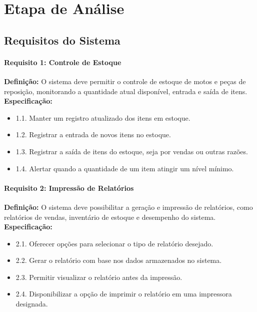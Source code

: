 
\chapter{Etapa de An\'{a}lise}


\section{Requisitos do Sistema}

\subsubsection{Requisito 1: Controle de Estoque}
\textbf{Definição:} O sistema deve permitir o controle de estoque de motos e peças de reposição, monitorando a quantidade atual disponível, entrada e saída de itens.
\\
\textbf{Especificação:}
\begin{itemize}
	\item 1.1. Manter um registro atualizado dos itens em estoque.
	\item 1.2. Registrar a entrada de novos itens no estoque.
	\item 1.3. Registrar a saída de itens do estoque, seja por vendas ou outras razões.
	\item 1.4. Alertar quando a quantidade de um item atingir um nível mínimo.
\end{itemize}

\subsubsection{Requisito 2: Impressão de Relatórios}
\textbf{Definição:} O sistema deve possibilitar a geração e impressão de relatórios, como relatórios de vendas, inventário de estoque e desempenho do sistema.
\\
\textbf{Especificação:}
\begin{itemize}
	\item 2.1. Oferecer opções para selecionar o tipo de relatório desejado.
	\item 2.2. Gerar o relatório com base nos dados armazenados no sistema.
	\item 2.3. Permitir visualizar o relatório antes da impressão.
	\item 2.4. Disponibilizar a opção de imprimir o relatório em uma impressora designada.
\end{itemize}


